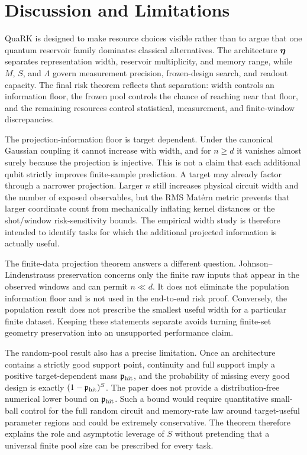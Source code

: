\section{Discussion and Limitations}
\label{sec:discussion}

QuaRK is designed to make resource choices visible rather than to argue that
one quantum reservoir family dominates classical alternatives.  The
architecture $\bm{\eta}$ separates representation width, reservoir multiplicity,
and memory range, while $M$, $S$, and $\Lambda$ govern measurement precision,
frozen-design search, and readout capacity.  The final risk theorem reflects
that separation: width controls an information floor, the frozen pool controls
the chance of reaching near that floor, and the remaining resources control
statistical, measurement, and finite-window discrepancies.

The projection-information floor is target dependent.  Under the canonical
Gaussian coupling it cannot increase with width, and for $n\geq d$ it vanishes
almost surely because the projection is injective.  This is not a claim that
each additional qubit strictly improves finite-sample prediction.  A target
may already factor through a narrower projection.  Larger $n$ still increases
physical circuit width and the number of exposed observables, but the RMS
Mat\'ern metric prevents that larger coordinate count from mechanically
inflating kernel distances or the shot/window risk-sensitivity bounds.  The
empirical width study is therefore intended to identify tasks for which the
additional projected information is actually useful.

The finite-data projection theorem answers a different question.
Johnson--Lindenstrauss preservation concerns only the finite raw inputs that
appear in the observed windows and can permit $n\ll d$.  It does not eliminate
the population information floor and is not used in the end-to-end risk proof.
Conversely, the population result does not prescribe the smallest useful width
for a particular finite dataset.  Keeping these statements separate avoids
turning finite-set geometry preservation into an unsupported performance
claim.

The random-pool result also has a precise limitation.  Once an architecture
contains a strictly good support point, continuity and full support imply a
positive target-dependent mass $\mathfrak p_{\mathrm{hit}}$, and the probability of
missing every good design is exactly $(1-\mathfrak p_{\mathrm{hit}})^S$.  The paper does
not provide a distribution-free numerical lower bound on
$\mathfrak p_{\mathrm{hit}}$.  Such a bound would require quantitative small-ball
control for the full random circuit and memory-rate law around target-useful
parameter regions and could be extremely conservative.  The theorem therefore
explains the role and asymptotic leverage of $S$ without pretending that a
universal finite pool size can be prescribed for every task.

